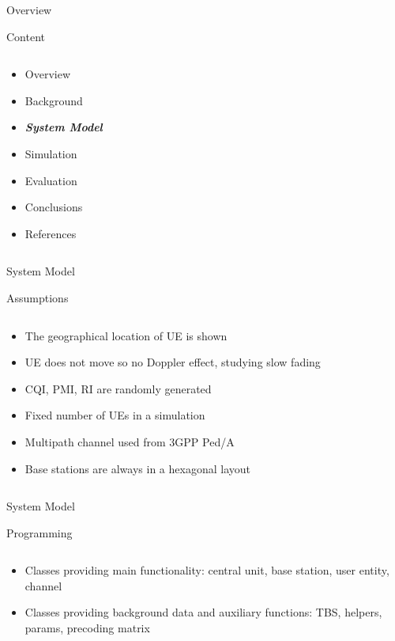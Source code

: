 \documentclass[xcolor={cmyk}]{beamer}
\begin{document}
\begin{frame}{Overview}
	\begin{block}{Content}
		\begin{columns}
			\begin{column}{.9\textwidth}
				\begin{itemize}
					\item Overview
					\item Background
					\item \textbf{\emph{System Model}}
					\item Simulation
					\item Evaluation
					\item Conclusions
					\item References
				\end{itemize}
			\end{column}
		\end{columns}
	\end{block}
\end{frame}

 \begin{frame}{System Model}
	 \begin{block}{Assumptions}
	 	\begin{columns}
			\begin{column}{.9\textwidth}
				\begin{itemize}
					\item The geographical location of UE is shown 
					\item UE does not move so no Doppler effect, studying slow fading
					\item CQI, PMI, RI are randomly generated
					\item Fixed number of UEs in a simulation
					\item Multipath channel used from 3GPP Ped/A
					\item Base stations are always in a hexagonal layout
				\end{itemize}
			\end{column}
		\end{columns}
	 \end{block}
 \end{frame}
 
 \begin{frame}{System Model}
	 \begin{block}{Programming}
	 	\begin{columns}
			\begin{column}{.9\textwidth}
				\begin{itemize}
					\item Classes providing main functionality: central unit, base station, user entity, channel
					\item Classes providing background data and auxiliary functions: TBS, helpers, params, precoding matrix
				\end{itemize}
			\end{column}
		\end{columns}
	 \end{block}
 \end{frame}
 
\end{document}
